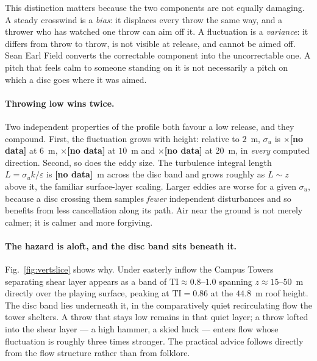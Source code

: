 \documentclass[11pt,letterpaper]{article}
\newcommand{\MISSINGNUM}{\textbf{\color{red}[no data]}}%
\newcommand{\VertSigGrowthSix}{\MISSINGNUM}\newcommand{\VertSigGrowthTen}{\MISSINGNUM}%
\newcommand{\VertSigGrowthTwenty}{\MISSINGNUM}\newcommand{\VertLintRange}{\MISSINGNUM}%
\begin{document}
This distinction matters because the two components are not equally damaging.
A steady crosswind is a \emph{bias}: it displaces every throw the same way, and
a thrower who has watched one throw can aim off it. A fluctuation is a
\emph{variance}: it differs from throw to throw, is not visible at release, and
cannot be aimed off. Sean Earl Field converts the correctable component into
the uncorrectable one. A pitch that feels calm to someone standing on it is not
necessarily a pitch on which a disc goes where it was aimed.

\paragraph{Throwing low wins twice.}
Two independent properties of the profile both favour a low release, and they
compound. First, the fluctuation grows with height: relative to $2$~m,
$\sigma_u$ is $\times$\VertSigGrowthSix{} at $6$~m, $\times$\VertSigGrowthTen{}
at $10$~m and $\times$\VertSigGrowthTwenty{} at $20$~m, in \emph{every}
computed direction. Second, so does the eddy size. The turbulence integral
length $L = \sigma_u k/\varepsilon$ is \VertLintRange{}~m across the disc band
and grows roughly as $L \sim z$ above it, the familiar surface-layer scaling.
Larger eddies are worse for a given $\sigma_u$, because a disc crossing them
samples \emph{fewer} independent disturbances and so benefits from less
cancellation along its path. Air near the ground is not merely calmer; it is
calmer and more forgiving.

\paragraph{The hazard is aloft, and the disc band sits beneath it.}
Fig.~\ref{fig:vertslice} shows why. Under easterly inflow the Campus Towers
separating shear layer appears as a band of $\mathrm{TI} \approx 0.8$--$1.0$
spanning $z \approx 15$--$50$~m directly over the playing surface, peaking at
$\mathrm{TI} = 0.86$ at the $44.8$~m roof height. The disc band lies underneath
it, in the comparatively quiet recirculating flow the tower shelters. A throw
that stays low remains in that quiet layer; a throw lofted into the shear layer
--- a high hammer, a skied huck --- enters flow whose fluctuation is roughly
three times stronger. The practical advice follows directly from the flow
structure rather than from folklore.
\end{document}
